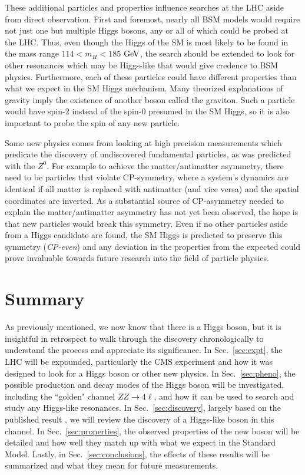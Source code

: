 These additional particles and properties influence searches at the LHC aside from direct observation. First and foremost, nearly all BSM models would require not just one but multiple Higgs bosons, any or all of which could be probed at the LHC. Thus, even though the Higgs of the SM is most likely to be found in the mass range $114<m_{H}<185$ $\rm{GeV}$, the search should be extended to look for other resonances which may be Higgs-like that would give credence to BSM physics. Furthermore, each of these particles could have different properties than what we expect in the SM Higgs mechanism. Many theorized explanations of gravity imply the existence of another boson called the graviton. Such a particle would have spin-2 instead of the spin-0 presumed in the SM Higgs, so it is also important to probe the spin of any new particle.

Some new physics comes from looking at high precision measurements which predicate the discovery of undiscovered fundamental particles, as was predicted with the $Z^{0}$. For example to achieve the matter/antimatter asymmetry, there need to be particles that violate CP-symmetry, where a system's dynamics are identical if all matter is replaced with antimatter (and vice versa) and the spatial coordinates are inverted. As a substantial source of CP-asymmetry needed to explain the matter/antimatter asymmetry has not yet been observed, the hope is that new particles would break this symmetry. Even if no other particles aside from a Higgs candidate are found, the SM Higgs is predicted to preserve this symmetry (\textit{CP-even}) and any deviation in the properties from the expected could prove invaluable towards future research into the field of particle physics.

\section{Summary}
\label{sec:intro_summary}

As previously mentioned, we now know that there is a Higgs boson, but it is insightful in retrospect to walk through the discovery chronologically to understand the process and appreciate its significance. In Sec.~\ref{sec:expt}, the LHC will be expounded, particularly the CMS experiment and how it was designed to look for a Higgs boson or other new physics. In Sec.~\ref{sec:pheno}, the possible production and decay modes of the Higgs boson will be investigated, including the ``golden" channel $ZZ\rightarrow 4\ell$, and how it can be used to search and study any Higgs-like resonances. In Sec.~\ref{sec:discovery}, largely based on the published result \cite{Higgs4lLegacy:2013}, we will review the discovery of a Higgs-like boson in this channel. In Sec.~\ref{sec:properties}, the observed properties of the new boson will be detailed and how well they match up with what we expect in the Standard Model. Lastly, in Sec.~\ref{sec:conclusions}, the effects of these results will be summarized and what they mean for future measurements.